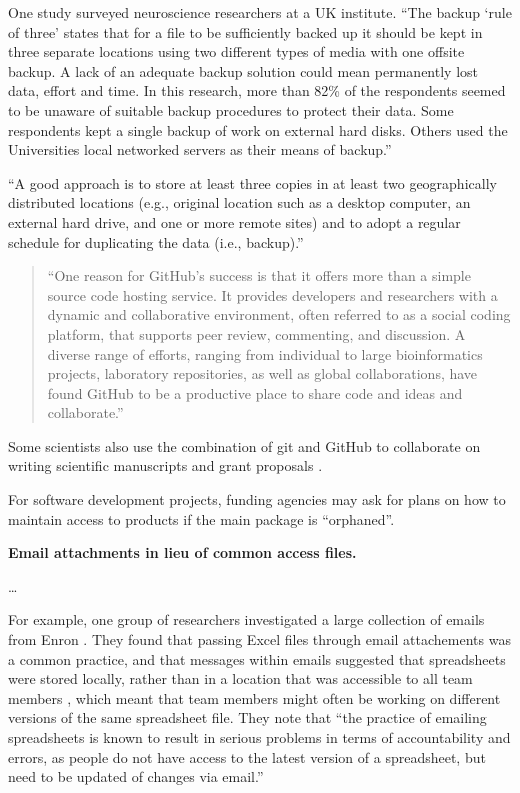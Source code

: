 \documentclass[]{tufte-book}
\begin{document}
One study surveyed neuroscience researchers at a UK institute. ``The backup `rule
of three' states that for a file to be sufficiently backed up it should be kept
in three separate locations using two different types of media with one offsite
backup. A lack of an adequate backup solution could mean permanently lost data,
effort and time. In this research, more than 82\% of the respondents seemed to be
unaware of suitable backup procedures to protect their data. Some respondents
kept a single backup of work on external hard disks. Others used the
Universities local networked servers as their means of backup.''
\citep{altarawneh2017pilot}

``A good approach is to store at least three copies in at least two
geographically distributed locations (e.g., original location such as a desktop
computer, an external hard drive, and one or more remote sites) and to adopt a
regular schedule for duplicating the data (i.e., backup).'' \citep{michener2015ten}

\begin{quote}
``One reason for GitHub's success is that it offers more than a simple source
code hosting service. It provides developers and researchers with a dynamic
and collaborative environment, often referred to as a social coding platform,
that supports peer review, commenting, and discussion. A diverse range of efforts,
ranging from individual to large bioinformatics projects, laboratory repositories,
as well as global collaborations, have found GitHub to be a productive place
to share code and ideas and collaborate.'' \citep{perez2016ten}
\end{quote}

Some scientists also use the combination of git and GitHub to collaborate
on writing scientific
manuscripts and grant proposals \citep{perez2016ten}.

For software development projects, funding agencies may ask for plans on how to maintain
access to products if the main package is ``orphaned''.

\textbf{Email attachments in lieu of common access files.}

\ldots{}

For example, one group of researchers investigated a large collection of emails
from Enron \citep{hermans2015enron}. They found that passing Excel files through
email attachements was a common practice, and that messages within emails
suggested that spreadsheets were stored locally, rather than in a location that
was accessible to all team members \citep{hermans2015enron}, which meant that team
members might often be working on different versions of the same spreadsheet
file. They note that ``the practice of emailing spreadsheets is known to result in
serious problems in terms of accountability and errors, as people do not have
access to the latest version of a spreadsheet, but need to be updated of changes
via email.'' \citep{hermans2015enron}
\end{document}
